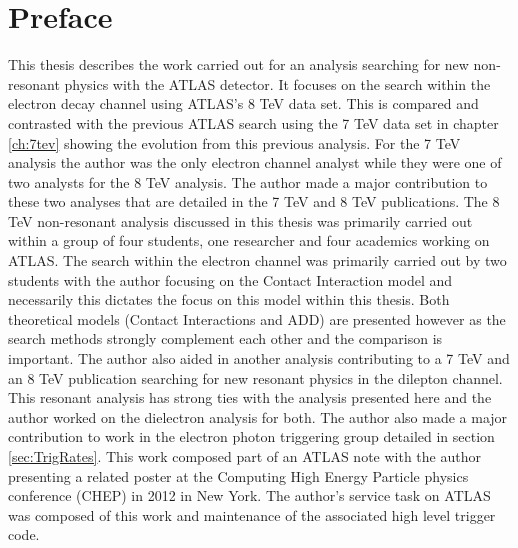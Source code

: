 \chapter*{Preface}
\pagestyle{headings}
\pagestyle{headings}

This thesis describes the work carried out for an analysis searching for new non-resonant physics with the ATLAS detector. It focuses on the search within the electron decay channel using ATLAS's 8 TeV data set. This is compared and contrasted with the previous ATLAS search using the 7 TeV data set in chapter \ref{ch:7tev} showing the evolution from this previous analysis. For the 7 TeV analysis the author was the only electron channel analyst while they were one of two analysts for the 8 TeV analysis. The author made a major contribution to these two analyses that are detailed in the 7 TeV \cite{PhysRevD.87.015010} and 8 TeV \cite{ATLAS-CONF-2014-030} publications.
The 8 TeV non-resonant analysis discussed in this thesis was primarily carried out within a group of four students, one researcher and four academics working on ATLAS. The search within the electron channel was primarily carried out by two students with the author focusing on the Contact Interaction model and necessarily this dictates the focus on this model within this thesis. Both theoretical models (Contact Interactions and ADD) are presented however as the search methods strongly complement each other and the comparison is important.
The author also aided in another analysis contributing to a 7 TeV \cite{Aad:2012hf} and an 8 TeV \cite{Z:1515998} publication searching for new resonant physics in the dilepton channel. This resonant analysis has strong ties with the analysis presented here and the author worked on the dielectron analysis for both.
The author also made a major contribution to work in the electron photon triggering group detailed in section \ref{sec:TrigRates}. This work composed part of an ATLAS note \cite{ATL-PHYS-PUB-2011-007} with the author presenting a related poster \cite{Duguid:1450151} at the Computing High Energy Particle physics conference (CHEP) in 2012 in New York. 
The author's service task on ATLAS was composed of this work and maintenance of the associated high level trigger code.





